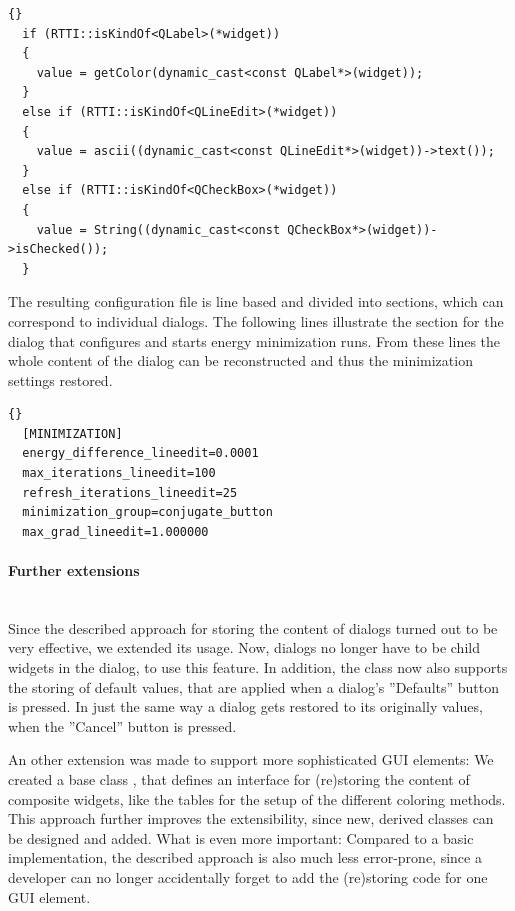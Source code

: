 \begin{lstlisting}{}
  if (RTTI::isKindOf<QLabel>(*widget))
  {
  	value = getColor(dynamic_cast<const QLabel*>(widget));
  }
  else if (RTTI::isKindOf<QLineEdit>(*widget))
  {
    value = ascii((dynamic_cast<const QLineEdit*>(widget))->text());
  }
  else if (RTTI::isKindOf<QCheckBox>(*widget))
  {
    value = String((dynamic_cast<const QCheckBox*>(widget))->isChecked());
  }
\end{lstlisting}

The resulting configuration file is line based and divided into sections,
which can correspond to individual dialogs. The following lines illustrate
the section for the dialog that configures and starts energy minimization runs.
From these lines the whole content of the dialog can be reconstructed and thus the 
minimization settings restored.
\begin{lstlisting}{}
  [MINIMIZATION]
  energy_difference_lineedit=0.0001
  max_iterations_lineedit=100
  refresh_iterations_lineedit=25
  minimization_group=conjugate_button
  max_grad_lineedit=1.000000
\end{lstlisting}

\paragraph{Further extensions}
\hspace*{\fill}\\
Since the described approach for storing the content of dialogs turned out to be very 
effective, we extended its usage. 
Now, dialogs no longer have to be child widgets in the 
 dialog, to use this feature.
In addition, the  class now also supports the storing of default 
values, that are applied when a dialog's ''Defaults'' button is pressed.
In just the same way a dialog gets restored to its originally values, when the ''Cancel'' 
button is pressed.

An other extension was made to support more sophisticated GUI elements: We
created a base class , that defines an 
interface for (re)storing the content of composite widgets, like \eg the 
tables for the setup of the different coloring methods. This approach further
improves the extensibility, since new, derived
 classes can be designed and added.
What is even more important: Compared to a basic implementation, the described
approach is also much less error-prone, since a developer can no longer
accidentally forget to add the (re)storing code for one GUI element.

